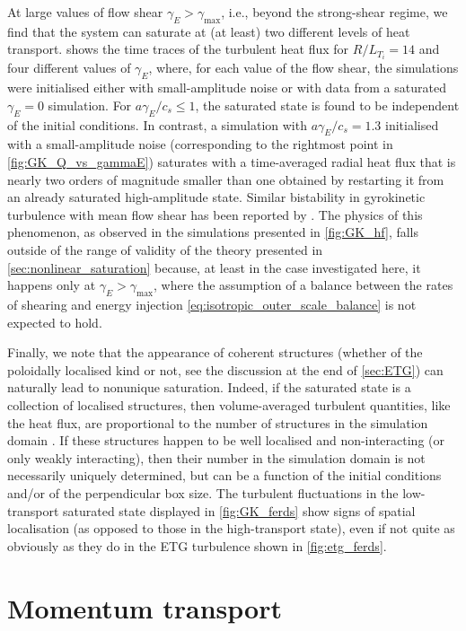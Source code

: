 \documentclass{jpp}
\newcommand{\gammaE}{\gamma_{E}}
\begin{document}
At large values of flow shear \(\gammaE > \gamma_\text{max}\), i.e., beyond the strong-shear regime, we find that the system can saturate at (at least) two different levels of heat transport.  shows the time traces of the turbulent heat flux for \(R/L_{T_i} = 14\) and four different values of \(\gammaE\), where, for each value of the flow shear, the simulations were initialised either with small-amplitude noise or with data from a saturated \(\gammaE = 0\) simulation. For \(a\gammaE/c_s \leq 1\), the saturated state is found to be independent of the initial conditions. In contrast, a simulation with \(a\gammaE/c_s = 1.3\) initialised with a small-amplitude noise (corresponding to the rightmost point in \cref{fig:GK_Q_vs_gammaE}) saturates with a time-averaged radial heat flux that is nearly two orders of magnitude smaller than one obtained by restarting it from an already saturated high-amplitude state. Similar bistability in gyrokinetic turbulence with mean flow shear has been reported by \citet{christen22}. The physics of this phenomenon, as observed in the simulations presented in \cref{fig:GK_hf}, falls outside of the range of validity of the theory presented in \cref{sec:nonlinear_saturation} because, at least in the case investigated here, it happens only at \(\gammaE > \gamma_\text{max}\), where the assumption of a balance between the rates of shearing and energy injection \cref{eq:isotropic_outer_scale_balance} is not expected to hold. 


Finally, we note that the appearance of coherent structures (whether of the poloidally localised kind or not, see the discussion at the end of \cref{sec:ETG}) can naturally lead to nonunique saturation. Indeed, if the saturated state is a collection of localised structures, then volume-averaged turbulent quantities, like the heat flux, are proportional to the number of structures in the simulation domain \citep{vanwyk2016}. If these structures happen to be well localised and non-interacting (or only weakly interacting), then their number in the simulation domain is not necessarily uniquely determined, but can be a function of the initial conditions and/or of the perpendicular box size. The turbulent fluctuations in the low-transport saturated state displayed in \cref{fig:GK_ferds} show signs of spatial localisation (as opposed to those in the high-transport state), even if not quite as obviously as they do in the ETG turbulence shown in \cref{fig:etg_ferds}.


\section{Momentum transport}
\label{sec:momflux}
\end{document}
